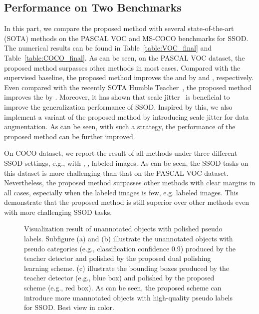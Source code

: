 \documentclass[letterpaper]{article} \usepackage{aaai23}  \usepackage{times}  \usepackage{helvet}  \usepackage{courier}  \usepackage[hyphens]{url}  \usepackage{graphicx} \urlstyle{rm} \def\UrlFont{\rm}  \usepackage{natbib}  \usepackage{caption} \frenchspacing  \setlength{\pdfpagewidth}{8.5in}  \setlength{\pdfpageheight}{11in}  \usepackage{algorithm}
\begin{document}
\subsection{Performance on Two Benchmarks}
In this part, we compare the proposed method with several state-of-the-art (SOTA) methods on the PASCAL VOC and MS-COCO benchmarks for SSOD. The numerical results can be found in Table~\ref{table:VOC_final} and Table~\ref{table:COCO_final}. As can be seen, on the PASCAL VOC dataset, the proposed method surpasses other methods in most cases. Compared with the supervised baseline, the proposed method improves the  and  by  and , respectively. Even compared with the recently SOTA Humble Teacher~\cite{tang2021humble}, the proposed method improves the  by . Moreover, it has shown that scale jitter~\cite{xu2021end} is beneficial to improve the generalization performance of SSOD. Inspired by this, we also implement a variant of the proposed method by introducing scale jitter for data augmentation. As can be seen, with such a strategy, the performance of the proposed method can be further improved.

On COCO dataset, we report the result of all methods under three different SSOD settings, e.g., with , ,  labeled images. As can be seen, the SSOD tasks on this dataset is more challenging than that on the PASCAL VOC dataset. Nevertheless, the proposed method surpasses other methods with clear margins in all cases, especially when the labeled images is few, e.g.  labeled images. This demonstrate that the proposed method is still superior over other methods even with more challenging SSOD tasks.


\begin{figure}[htbp]
    \centering
    \caption{Visualization result of unannotated objects with polished pseudo labels. Subfigure (a) and (b) illustrate the unannotated objects with pseudo categories (e.g., classification confidence  0.9) produced by the teacher detector and polished by the proposed dual polishing learning scheme. (c) illustrate the bounding boxes produced by the teacher detector (e.g., blue box) and polished by the proposed scheme (e.g., red box). As can be seen, the proposed scheme can introduce more unannotated objects with high-quality pseudo labels for SSOD. Best view in color.}
    \label{fig:visual-donut}
\end{figure}
\end{document}
